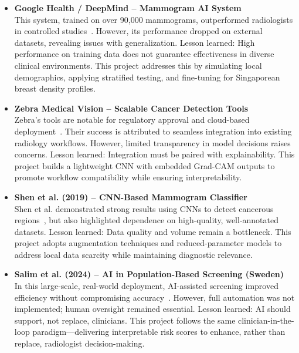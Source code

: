 \documentclass[12pt]{article}
\begin{document}
\begin{itemize}
    \item \textbf{Google Health / DeepMind – Mammogram AI System} \\
    This system, trained on over 90,000 mammograms, outperformed radiologists in controlled studies~\cite{11}. However, its performance dropped on external datasets, revealing issues with generalization. Lesson learned: High performance on training data does not guarantee effectiveness in diverse clinical environments. This project addresses this by simulating local demographics, applying stratified testing, and fine-tuning for Singaporean breast density profiles.

    \item \textbf{Zebra Medical Vision – Scalable Cancer Detection Tools} \\
    Zebra’s tools are notable for regulatory approval and cloud-based deployment~\cite{12}. Their success is attributed to seamless integration into existing radiology workflows. However, limited transparency in model decisions raises concerns. Lesson learned: Integration must be paired with explainability. This project builds a lightweight CNN with embedded Grad-CAM outputs to promote workflow compatibility while ensuring interpretability.

    \item \textbf{Shen et al. (2019) – CNN-Based Mammogram Classifier} \\
    Shen et al. demonstrated strong results using CNNs to detect cancerous regions~\cite{7}, but also highlighted dependence on high-quality, well-annotated datasets. Lesson learned: Data quality and volume remain a bottleneck. This project adopts augmentation techniques and reduced-parameter models to address local data scarcity while maintaining diagnostic relevance.

    \item \textbf{Salim et al. (2024) – AI in Population-Based Screening (Sweden)} \\
    In this large-scale, real-world deployment, AI-assisted screening improved efficiency without compromising accuracy~\cite{13}. However, full automation was not implemented; human oversight remained essential. Lesson learned: AI should support, not replace, clinicians. This project follows the same clinician-in-the-loop paradigm—delivering interpretable risk scores to enhance, rather than replace, radiologist decision-making.
\end{itemize}
\end{document}
